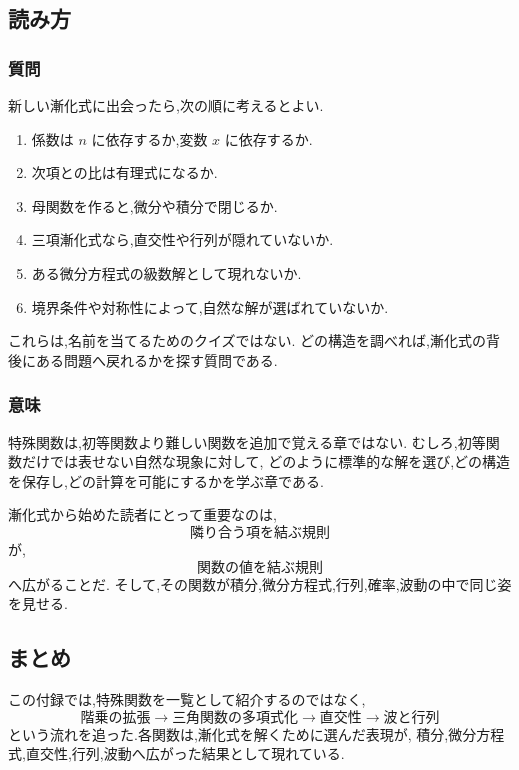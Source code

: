 \subsection{読み方}

\subsubsection{質問}

新しい漸化式に出会ったら,次の順に考えるとよい.

\begin{enumerate}
  \item 係数は $n$ に依存するか,変数 $x$ に依存するか.
  \item 次項との比は有理式になるか.
  \item 母関数を作ると,微分や積分で閉じるか.
  \item 三項漸化式なら,直交性や行列が隠れていないか.
  \item ある微分方程式の級数解として現れないか.
  \item 境界条件や対称性によって,自然な解が選ばれていないか.
\end{enumerate}

これらは,名前を当てるためのクイズではない.
どの構造を調べれば,漸化式の背後にある問題へ戻れるかを探す質問である.

\subsubsection{意味}

特殊関数は,初等関数より難しい関数を追加で覚える章ではない.
むしろ,初等関数だけでは表せない自然な現象に対して,
どのように標準的な解を選び,どの構造を保存し,どの計算を可能にするかを学ぶ章である.

漸化式から始めた読者にとって重要なのは,
\[
  \text{隣り合う項を結ぶ規則}
\]
が,
\[
  \text{関数の値を結ぶ規則}
\]
へ広がることだ.
そして,その関数が積分,微分方程式,行列,確率,波動の中で同じ姿を見せる.

\subsection*{まとめ}

この付録では,特殊関数を一覧として紹介するのではなく,
\[
  \text{階乗の拡張}
  \longrightarrow
  \text{三角関数の多項式化}
  \longrightarrow
  \text{直交性}
  \longrightarrow
  \text{波と行列}
\]
という流れを追った.各関数は,漸化式を解くために選んだ表現が,
積分,微分方程式,直交性,行列,波動へ広がった結果として現れている.
